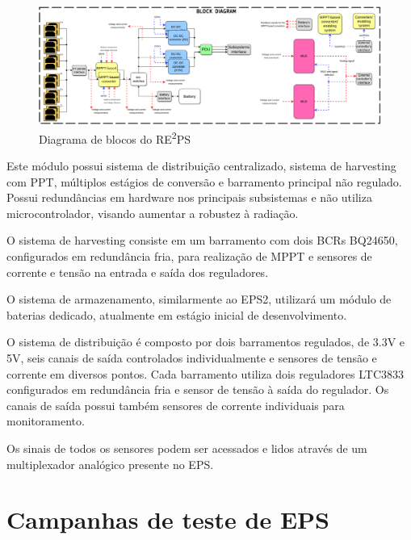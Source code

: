 \begin{figure}[htp]
    \caption{Diagrama de blocos do RE\textsuperscript{2}PS}
    \begin{center}
        \includegraphics[width=\textwidth, keepaspectratio]{images/reeps-block-diagram.png}
    \end{center}
    \label{fig:reeps-diagrama-blocos}
\end{figure}

Este módulo possui sistema de distribuição centralizado, sistema de harvesting com \gls{PPT}, múltiplos estágios de conversão e barramento principal não regulado.
Possui redundâncias em hardware nos principais subsistemas e não utiliza microcontrolador, visando aumentar a robustez à radiação.

O sistema de harvesting consiste em um barramento com dois \gls{BCR}s BQ24650, configurados em redundância fria, para realização de \gls{MPPT} e sensores de corrente e tensão na entrada e saída dos reguladores.

O sistema de armazenamento, similarmente ao \gls{EPS2}, utilizará um módulo de baterias dedicado, atualmente em estágio inicial de desenvolvimento.

O sistema de distribuição é composto por dois barramentos regulados, de 3.3V e 5V, seis canais de saída controlados individualmente e sensores de tensão e corrente em diversos pontos.
Cada barramento utiliza dois reguladores LTC3833 configurados em redundância fria e sensor de tensão à saída do regulador. Os canais de saída possui também sensores de corrente individuais para monitoramento.

Os sinais de todos os sensores podem ser acessados e lidos através de um multiplexador analógico presente no \gls{EPS}.





\section{Campanhas de teste de EPS}\label{sec:testes-epss}

